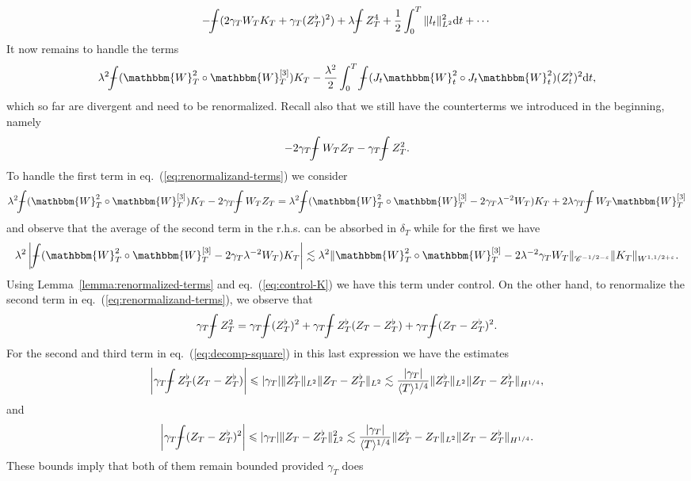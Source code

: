\documentclass[11pt, oneside]{article}   	%
\newcommand{\mathd}{\mathrm{d}}
\def\Xint#1{\mathchoice
{\XXint\displaystyle\textstyle{#1}}%
{\XXint\textstyle\scriptstyle{#1}}%
{\XXint\scriptstyle\scriptscriptstyle{#1}}%
{\XXint\scriptscriptstyle\scriptscriptstyle{#1}}%
\!\int}
\def\XXint#1#2#3{{\setbox0=\hbox{$#1{#2#3}{\int}$ }
\vcenter{\hbox{$#2#3$ }}\kern-.6\wd0}}
\def\dashint{\Xint-}
\newcommand{\bint}{\dashint}
\newcommand{\VV}{\mathscr{C}}
\begin{document}
\[ - \bint (2 \gamma_T W_T K_T + \gamma_T (Z_T^{\flat})^2) + \lambda \bint 
   Z_T^4 + \frac{1}{2} \int_0^T \| l_t \|^2_{L^2} \mathd t + \cdots \]
It now remains to handle the terms
\begin{equation}
  \lambda^2 \bint (\mathbbm{W}^2_T \circ \mathbbm{W}_T^{[3]}) K_T -
  \frac{\lambda^2}{2} \int_0^T \bint (J_t \mathbbm{W}^2_t \circ J_t
  \mathbbm{W}^2_t ) (Z^{\flat}_t)^2 \mathd t, \label{eq:renormalizand-terms}
\end{equation}
which so far are divergent and need to be renormalized. Recall also that we
still have the counterterms we introduced in the beginning, namely
\[ - 2 \gamma_T \bint W_T Z_T - \gamma_T \bint Z^2_T . \]
To handle the first term in eq.~(\ref{eq:renormalizand-terms}) we consider
\[ \lambda^2 \bint (\mathbbm{W}^2_T \circ \mathbbm{W}_T^{[3]}) K_T - 2
   \gamma_T \bint W_T Z_T = \lambda^2 \bint (\mathbbm{W}^2_T \circ
   \mathbbm{W}_T^{[3]} - 2 \gamma_T \lambda^{- 2} W_T) K_T + 2 \lambda
   \gamma_T \bint W_T \mathbbm{W}_T^{[3]} \]
and observe that the average of the second term in the r.h.s. can be absorbed
in $\delta_T$ while for the first we have
\[ \lambda^2 \left| \bint (\mathbbm{W}^2_T \circ \mathbbm{W}_T^{[3]} - 2
   \gamma_T \lambda^{- 2} W_T) K_T \right| \lesssim \lambda^2 \|
   \mathbbm{W}^2_T \circ \mathbbm{W}_T^{[3]} - 2 \lambda^{- 2} \gamma_T W_T
   \|_{\VV^{- 1 / 2 - \varepsilon}} \| K_T \|_{W^{1, 1 / 2 + \varepsilon}} .
\]
Using Lemma~\ref{lemma:renormalized-terms} and eq.~(\ref{eq:control-K}) we
have this term under control. On the other hand, to renormalize the second
term in eq.~(\ref{eq:renormalizand-terms}), we observe that
\begin{equation}
  \gamma_T \bint Z^2_T = \gamma_T \bint (Z^{\flat}_T)^2 + \gamma_T \bint
  Z^{\flat}_T (Z_T - Z^{\flat}_T) + \gamma_T \bint (Z_T - Z^{\flat}_T)^2 .
  \label{eq:decomp-square}
\end{equation}
For the second and third term in eq.~(\ref{eq:decomp-square}) in this last
expression we have the estimates
\[ \left| \gamma_T \bint Z^{\flat}_T (Z_T - Z^{\flat}_T) \right| \leqslant |
   \gamma_T | \| Z^{\flat}_T \|_{L^2} \| Z_T - Z^{\flat}_T \|_{L^2} \lesssim
   \frac{| \gamma_T |}{\langle T \rangle^{1 / 4}} \| Z^{\flat}_T \|_{L^2} \|
   Z_T - Z^{\flat}_T \|_{H^{1 / 4}}, \]
and
\[ \left| \gamma_T \bint (Z_T - Z^{\flat}_T)^2 \right| \leqslant | \gamma_T |
   \| Z_T - Z^{\flat}_T \|^2_{L^2} \lesssim \frac{| \gamma_T |}{\langle T
   \rangle^{1 / 4}} \| Z^{\flat}_T - Z_T \|_{L^2} \| Z_T - Z^{\flat}_T
   \|_{H^{1 / 4}} . \]
These bounds imply that both of them remain bounded provided $\gamma_T$ does
\end{document}
